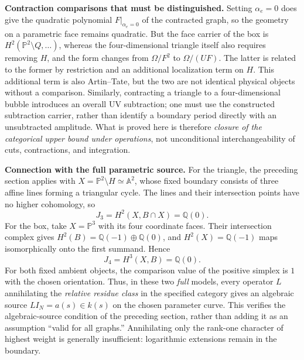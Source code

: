 \documentclass[11pt,a4paper,oneside]{article}
\theoremstyle{plain}
\theoremstyle{definition}
\theoremstyle{remark}
\newcommand{\Q}{\mathbb Q}
\numberwithin{equation}{section}
\begin{document}
\textbf{Contraction comparisons that must be distinguished.}
Setting $\alpha_e=0$ does give the quadratic polynomial $F|_{\alpha_e=0}$ of the contracted graph,
so the geometry on a parametric face remains quadratic.
But the face carrier of the box is $H^2(\mathbb P^2\setminus Q,\ldots)$,
whereas the four-dimensional triangle itself also requires removing $H$, and the form changes from $\Omega/F^2$ to $\Omega/(UF)$.
The latter is related to the former by restriction and an additional localization term on $H$.
This additional term is also Artin--Tate, but the two are not identical physical objects without a comparison.
Similarly, contracting a triangle to a four-dimensional bubble introduces an overall UV subtraction;
one must use the constructed subtraction carrier, rather than identify a boundary period directly with an unsubtracted amplitude.
What is proved here is therefore \emph{closure of the categorical upper bound under operations}, not unconditional interchangeability of cuts, contractions, and integration.

\textbf{Connection with the full parametric source.}
For the triangle, the preceding section applies with $X=\mathbb P^2\setminus H\simeq\mathbb A^2$,
whose fixed boundary consists of three affine lines forming a triangular cycle.
The lines and their intersection points have no higher cohomology, so
\[
 J_3=H^2(X,B\cap X)=\Q(0).
\]
For the box, take $X=\mathbb P^3$ with its four coordinate faces. Their intersection complex gives
$H^2(B)=\Q(-1)\oplus\Q(0)$,
and $H^2(X)=\Q(-1)$ maps isomorphically onto the first summand. Hence
\[
 J_4=H^3(X,B)=\Q(0).
\]
For both fixed ambient objects, the comparison value of the positive simplex is $1$ with the chosen orientation.
Thus, in these two \emph{full} models, every operator $L$ annihilating the \emph{relative residue class} in the specified category
gives an algebraic source $LI_N=a(s)\in k(s)$ on the chosen parameter curve.
This verifies the algebraic-source condition of the preceding section, rather than adding it as an assumption ``valid for all graphs.''
Annihilating only the rank-one character of highest weight is generally insufficient: logarithmic extensions remain in the boundary.
\end{document}
